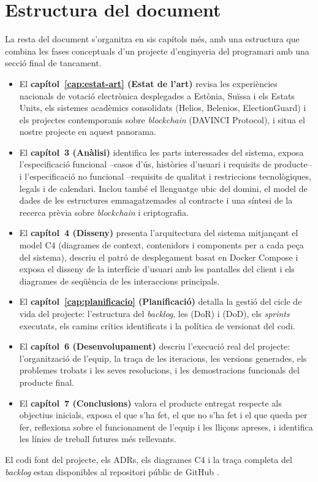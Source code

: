 \section{Estructura del document}
\label{sec:estructura}

La resta del document s'organitza en sis capítols més, amb una
estructura que combina les fases conceptuals d'un projecte d'enginyeria
del programari amb una secció final de tancament.

\begin{itemize}
    \item El \textbf{capítol~\ref{cap:estat-art} (Estat de l'art)}
    revisa les experiències nacionals de votació electrònica
    desplegades a Estònia, Suïssa i els Estats Units, els sistemes
    acadèmics consolidats (Helios, Belenios, ElectionGuard) i els
    projectes contemporanis sobre \emph{blockchain} (DAVINCI
    Protocol), i situa el nostre projecte en aquest panorama.

    \item El \textbf{capítol~3 (Anàlisi)} identifica les parts
    interessades del sistema, exposa l'especificació funcional --casos
    d'ús, històries d'usuari i requisits de producte-- i
    l'especificació no funcional --requisits de qualitat i restriccions
    tecnològiques, legals i de calendari. Inclou també el llenguatge
    ubic del domini, el model de dades de les estructures emmagatzemades
    al contracte i una síntesi de la recerca prèvia sobre
    \emph{blockchain} i criptografia.

    \item El \textbf{capítol~4 (Disseny)} presenta l'arquitectura del
    sistema mitjançant el model C4 (diagrames de context, contenidors
    i components per a cada peça del sistema), descriu el patró de
    desplegament basat en Docker Compose i exposa el disseny de la
    interfície d'usuari amb les pantalles del client i els diagrames
    de seqüència de les interaccions principals.

    \item El \textbf{capítol~\ref{cap:planificacio} (Planificació)}
    detalla la gestió del cicle de vida del projecte: l'estructura del
    \emph{backlog}, les  (\ac{DoR}) i  (\ac{DoD}),
    els \emph{sprints} executats, els camins crítics identificats i la
    política de versionat del codi.

    \item El \textbf{capítol~6 (Desenvolupament)} descriu l'execució
    real del projecte: l'organització de l'equip, la traça de les
    iteracions, les versions generades, els problemes trobats i les
    seves resolucions, i les demostracions funcionals del producte
    final.

    \item El \textbf{capítol~7 (Conclusions)} valora el producte
    entregat respecte als objectius inicials, exposa el que s'ha fet,
    el que no s'ha fet i el que queda per fer, reflexiona sobre el
    funcionament de l'equip i les lliçons apreses, i identifica les
    línies de treball futures més rellevants.
\end{itemize}

El codi font del projecte, els \acp{ADR}, els diagrames C4 i la traça
completa del \emph{backlog} estan disponibles al repositori públic de
GitHub \cite{demochainrepo}.
